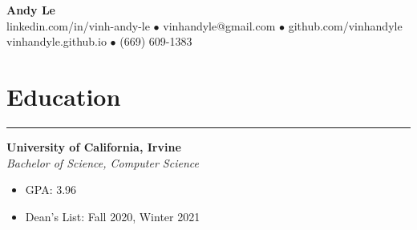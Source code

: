 \documentclass{article}
\begin{document}
   \begin{center}
      \Huge\textbf{Andy Le}\\
      \normalsize{linkedin.com/in/vinh-andy-le} $\bullet$
      \normalsize{vinhandyle@gmail.com} $\bullet$
      \normalsize{github.com/vinhandyle}\\
      \normalsize{vinhandyle.github.io} $\bullet$
      \normalsize{(669) 609-1383}
   \end{center}
\vspace{-20pt}

\section*{Education} \vspace{-6pt} \hrule \vspace{6pt}
\textbf{University of California, Irvine}\\
\textit{Bachelor of Science, Computer Science}
\begin{itemize}
	\item\vspace{-6pt} GPA: 3.96
	\item\vspace{-6pt} Dean's List: Fall 2020, Winter 2021
\end{itemize}
\vspace{-20pt}
\end{document}
